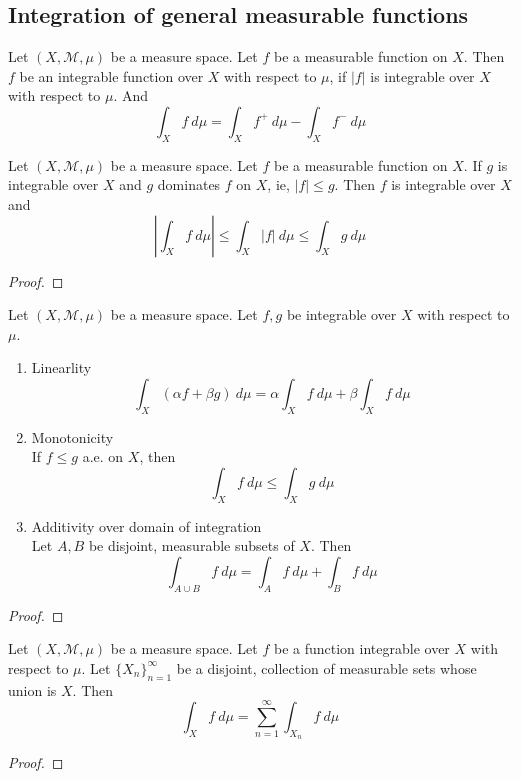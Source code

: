 \subsection{Integration of general measurable functions}
\begin{definition}
	Let $(X,\mathcal{M},\mu)$ be a measure space.
	Let $f$ be a measurable function on $X$.
	Then $f$ be an integrable function over $X$ with respect to $\mu$, if $|f|$ is integrable over $X$ with respect to $\mu$.
	And
	\[ \int_X f \ d\mu = \int_X f^+ \ d\mu - \int_X f^- \ d\mu \]
\end{definition}

\begin{theorem}
	Let $(X,\mathcal{M},\mu)$ be a measure space.
	Let $f$ be a measurable function on $X$.
	If $g$ is integrable over $X$ and $g$ dominates $f$ on $X$, ie, $|f| \le g$.
	Then $f$ is integrable over $X$ and 
	\[ \left| \int_X f \ d\mu \right| \le \int_X |f| \ d\mu \le \int_X g \ d\mu \]
\end{theorem}
\begin{proof}
\end{proof}

\begin{theorem}
	Let $(X,\mathcal{M},\mu)$ be a measure space.
	Let $f,g$ be integrable over $X$ with respect to $\mu$.
	\begin{enumerate}
		\item Linearlity \\
			\[ \int_X (\alpha f + \beta g) \ d\mu = \alpha \int_X f \ d\mu + \beta \int_X f \ d\mu \]
		\item Monotonicity \\
			If $f \le g$ a.e. on $X$, then
			\[ \int_X f \ d\mu \le \int_X g \ d\mu \]
		\item Additivity over domain of integration \\
			Let $A,B$ be disjoint, measurable subsets of $X$. Then
			\[ \int_{A \cup B} f \ d\mu = \int_A f \ d\mu + \int_B f \ d\mu \]
	\end{enumerate}
\end{theorem}
\begin{proof}
\end{proof}

\begin{theorem}
	Let $(X,\mathcal{M},\mu)$ be a measure space.
	Let $f$ be a function integrable over $X$ with respect to $\mu$.
	Let $\{ X_n \}_{n = 1}^\infty $ be a disjoint, collection of measurable sets whose union is $X$.
	Then
	\[ \int_X f \ d\mu = \sum_{n=1}^\infty \int_{X_n} f \ d\mu \]
\end{theorem}
\begin{proof}
\end{proof}


